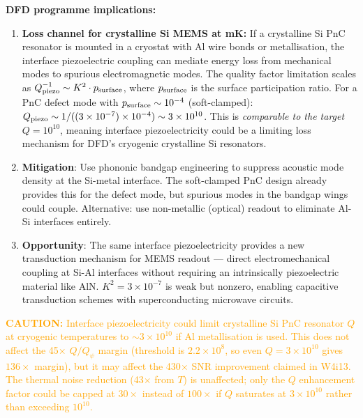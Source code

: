 \documentclass[11pt]{article}
\theoremstyle{definition}
\theoremstyle{remark}
\newcommand{\ee}[1]{\times 10^{#1}}
\newcommand{\Qpsi}{Q_\psi}
\newcommand{\caution}[1]{\textcolor{orange}{\textbf{CAUTION:} #1}}
\begin{document}
\begin{tcolorbox}[colback=blue!5!white, colframe=blue!50!black,
  title=\textbf{W4i14 TOP 5 FINDINGS --- Ranked by Programme Impact}]
\begin{enumerate}
\textbf{DFD programme implications:}
\begin{enumerate}[nosep]
\item \textbf{Loss channel for crystalline Si MEMS at mK:} If a
  crystalline Si PnC resonator is mounted in a cryostat with Al
  wire bonds or metallisation, the interface piezoelectric coupling
  can mediate energy loss from mechanical modes to spurious
  electromagnetic modes. The quality factor limitation scales as
  $Q_{\rm piezo}^{-1} \sim K^2 \cdot p_{\rm surface}$, where
  $p_{\rm surface}$ is the surface participation ratio. For a
  PnC defect mode with $p_{\rm surface} \sim 10^{-4}$ (soft-clamped):
  $Q_{\rm piezo} \sim 1/((3\ee{-7}) \times 10^{-4}) \sim 3\ee{10}$.
  This is \textit{comparable to the target $Q = 10^{10}$}, meaning
  interface piezoelectricity could be a limiting loss mechanism
  for DFD's cryogenic crystalline Si resonators.

\item \textbf{Mitigation}: Use phononic bandgap engineering to
  suppress acoustic mode density at the Si-metal interface. The
  soft-clamped PnC design already provides this for the defect
  mode, but spurious modes in the bandgap wings could couple.
  Alternative: use non-metallic (optical) readout to eliminate
  Al-Si interfaces entirely.

\item \textbf{Opportunity}: The same interface piezoelectricity
  provides a new transduction mechanism for MEMS readout ---
  direct electromechanical coupling at Si-Al interfaces without
  requiring an intrinsically piezoelectric material like AlN.
  $K^2 = 3\ee{-7}$ is weak but nonzero, enabling capacitive
  transduction schemes with superconducting microwave circuits.
\end{enumerate}

\caution{Interface piezoelectricity could limit crystalline Si
PnC resonator $Q$ at cryogenic temperatures to $\sim 3\ee{10}$
if Al metallisation is used. This does not affect the 45$\times$
$Q/\Qpsi$ margin (threshold is $2.2\ee{8}$, so even $Q = 3\ee{10}$
gives $136\times$ margin), but it may affect the 430$\times$ SNR
improvement claimed in W4i13. The thermal noise reduction (43$\times$
from $T$) is unaffected; only the $Q$ enhancement factor could be
capped at $30\times$ instead of $100\times$ if $Q$ saturates at
$3\ee{10}$ rather than exceeding $10^{10}$.}


\end{enumerate}
\end{tcolorbox}
\end{document}

